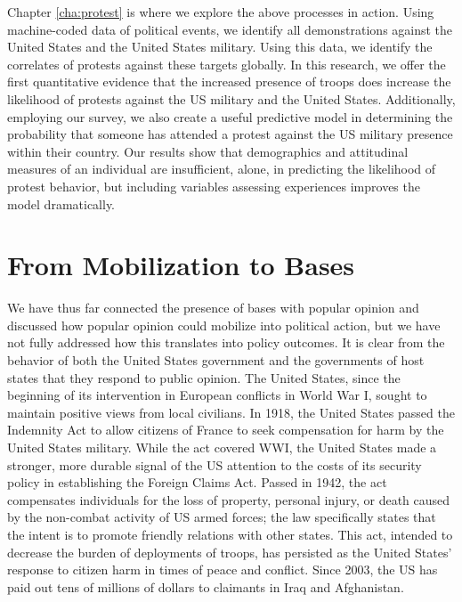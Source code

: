 Chapter \ref{cha:protest} is where we explore the above processes in action. Using machine-coded data of political events, we identify all demonstrations against the United States and the United States military. Using this data, we identify the correlates of protests against these targets globally. In this research, we offer the first quantitative evidence that the increased presence of troops does increase the likelihood of protests against the US military and the United States. Additionally, employing our survey, we also create a useful predictive model in determining the probability that someone has attended a protest against the US military presence within their country. Our results show that demographics and attitudinal measures of an individual are insufficient, alone, in predicting the likelihood of protest behavior, but including variables assessing experiences improves the model dramatically. 




\section*{From Mobilization to Bases}

We have thus far connected the presence of bases with popular opinion and discussed how popular opinion could mobilize into political action, but we have not fully addressed how this translates into policy outcomes. It is clear from the behavior of both the United States government and the governments of host states that they respond to public opinion. The United States, since the beginning of its intervention in European conflicts in World War I, sought to maintain positive views from local civilians. In 1918, the United States passed the Indemnity Act to allow citizens of France to seek compensation for harm by the United States military.\autocite{walerstein2009}  While the act covered WWI, the United States made a stronger, more durable signal of the US attention to the costs of its security policy in establishing the Foreign Claims Act. Passed in 1942, the act compensates individuals for the loss of property, personal injury, or death caused by the non-combat activity of US armed forces; the law specifically states that the intent is to promote friendly relations with other states.\autocite{ForeignClaims1942} This act, intended to decrease the burden of deployments of troops, has persisted as the United States' response to citizen harm in times of peace and conflict. Since 2003, the US has paid out tens of millions of dollars to claimants in Iraq and Afghanistan.\autocite{Currier2015}

